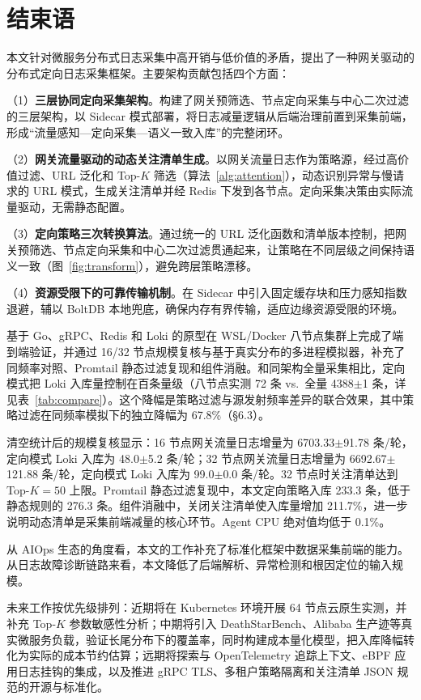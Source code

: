\section{结束语}

本文针对微服务分布式日志采集中高开销与低价值的矛盾，提出了一种网关驱动的分布式定向日志采集框架。主要架构贡献包括四个方面：

（1）\textbf{三层协同定向采集架构}。构建了网关预筛选、节点定向采集与中心二次过滤的三层架构，以 Sidecar 模式部署，将日志减量逻辑从后端治理前置到采集前端，形成``流量感知—定向采集—语义一致入库''的完整闭环。

（2）\textbf{网关流量驱动的动态关注清单生成}。以网关流量日志作为策略源，经过高价值过滤、URL 泛化和 Top-$K$ 筛选（算法~\ref{alg:attention}），动态识别异常与慢请求的 URL 模式，生成关注清单并经 Redis 下发到各节点。定向采集决策由实际流量驱动，无需静态配置。

（3）\textbf{定向策略三次转换算法}。通过统一的 URL 泛化函数和清单版本控制，把网关预筛选、节点定向采集和中心二次过滤贯通起来，让策略在不同层级之间保持语义一致（图~\ref{fig:transform}），避免跨层策略漂移。

（4）\textbf{资源受限下的可靠传输机制}。在 Sidecar 中引入固定缓存块和压力感知指数退避，辅以 BoltDB 本地兜底，确保内存有界传输，适应边缘资源受限的环境。

基于 Go、gRPC、Redis 和 Loki 的原型在 WSL/Docker 八节点集群上完成了端到端验证，并通过 16/32 节点规模复核与基于真实分布的多进程模拟器，补充了同频率对照、Promtail 静态过滤复现和组件消融。和同架构全量采集相比，定向模式把 Loki 入库量控制在百条量级（八节点实测 72 条 vs.\ 全量 4388$\pm$1 条，详见表~\ref{tab:compare}）。这个降幅是策略过滤与源发射频率差异的联合效果，其中策略过滤在同频率模拟下的独立降幅为 67.8\%（§6.3）。

清空统计后的规模复核显示：16 节点网关流量日志增量为 6703.33$\pm$91.78 条/轮，定向模式 Loki 入库为 48.0$\pm$5.2 条/轮；32 节点网关流量日志增量为 6692.67$\pm$121.88 条/轮，定向模式 Loki 入库为 99.0$\pm$0.0 条/轮。32 节点时关注清单达到 Top-$K{=}50$ 上限。Promtail 静态过滤复现中，本文定向策略入库 233.3 条，低于静态规则的 276.3 条。组件消融中，关闭关注清单使入库量增加 211.7\%，进一步说明动态清单是采集前端减量的核心环节。Agent CPU 绝对值均低于 0.1\%。

从 AIOps 生态的角度看，本文的工作补充了标准化框架中数据采集前端的能力。从日志故障诊断链路来看，本文降低了后端解析、异常检测和根因定位的输入规模。

未来工作按优先级排列：近期将在 Kubernetes 环境开展 64 节点云原生实测，并补充 Top-$K$ 参数敏感性分析；中期将引入 DeathStarBench、Alibaba 生产迹等真实微服务负载，验证长尾分布下的覆盖率，同时构建成本量化模型，把入库降幅转化为实际的成本节约估算；远期将探索与 OpenTelemetry 追踪上下文、eBPF 应用日志挂钩的集成，以及推进 gRPC TLS、多租户策略隔离和关注清单 JSON 规范的开源与标准化。

